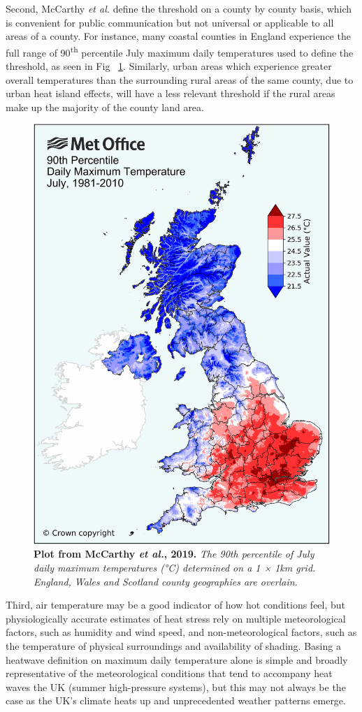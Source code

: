 \documentclass[10pt,letterpaper]{article}
\begin{document}
Second, McCarthy \textit{et al.} define the threshold on a county by county basis, which is convenient for public communication but not universal or applicable to all areas of a county.
For instance, many coastal counties in England experience the full range of 90\textsuperscript{th} percentile July maximum daily temperatures used to define the threshold, as seen in Fig ~\ref{McCarthy-fig3}.\cite{McCarthy2019}
Similarly, urban areas which experience greater overall temperatures than the surrounding rural areas of the same county, due to urban heat island effects, will have a less relevant threshold if the rural areas make up the majority of the county land area.

\begin{figure}
    \begin{center}
        \includegraphics[width=0.65\linewidth]{./mccarthy2019-fig3.jpg}
    \end{center}
    \caption{
    {\bf Plot from McCarthy \textit{et al.}, 2019.}
    \textit{The 90th percentile of July daily maximum temperatures (°C) determined on a 1 × 1km grid. England, Wales and Scotland county geographies are overlain.}\cite{McCarthy2019}
    }
    \label{McCarthy-fig3}
\end{figure}

Third, air temperature may be a good indicator of how hot conditions feel, but physiologically accurate estimates of heat stress rely on multiple meteorological factors, such as humidity and wind speed, and non-meteorological factors, such as the temperature of physical surroundings and availability of shading.
Basing a heatwave definition on maximum daily temperature alone is simple and broadly representative of the meteorological conditions that tend to accompany heat waves the UK (summer high-pressure systems), but this may not always be the case as the UK's climate heats up and unprecedented weather patterns emerge.
\end{document}
